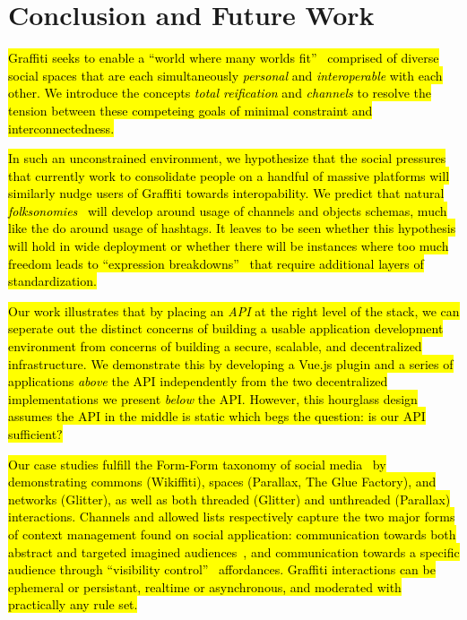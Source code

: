 \section{Conclusion and Future Work}

{\hl{%
Graffiti seeks to enable a ``world where many worlds fit''~{\cite{escobarpluriverse}}
comprised of diverse social spaces that are each simultaneously \emph{personal}
and \emph{interoperable} with each other.
We introduce the concepts \emph{total reification} and \emph{channels}
to resolve the tension between these competeing goals
of minimal constraint and interconnectedness.
}}%

{\hl{%
In such an unconstrained environment,
we hypothesize that the social pressures that currently work
to consolidate people on a handful of massive platforms
will similarly nudge users of Graffiti towards interopability.
We predict that natural \emph{folksonomies}~{\cite{folksonomy}} will
develop around usage of channels and objects schemas, much like the do around usage of hashtags.
It leaves to be seen whether this hypothesis will hold in wide deployment
or whether there will be instances where too much freedom leads to
``expression breakdowns''~{\cite{expressionbreakdowns}}
that require additional layers of standardization.
}}%

{\hl{%
Our work illustrates that by placing an \emph{API}
at the right level of the stack, we can seperate out the distinct concerns
of building a usable application development environment
from concerns of building a secure, scalable, and decentralized infrastructure.
We demonstrate this by developing a Vue.js plugin and a series
of applications \emph{above} the API independently from the
two decentralized implementations we present \emph{below} the API.
However, this hourglass design assumes the API in the middle is static
which begs the question: is our API sufficient?
}}%

{\hl{%
Our case studies fulfill the Form-Form taxonomy of social media~{\cite{formfrom}}
by demonstrating commons (Wikiffiti), spaces (Parallax, The Glue Factory), and networks (Glitter),
as well as both threaded (Glitter) and unthreaded (Parallax) interactions.
Channels and allowed lists respectively capture the two major
forms of context management found on social application:
communication towards both abstract and targeted imagined audiences~{\cite{imaginedaudience}},
and communication towards a specific audience through ``visibility control''~{\cite{visibilitycontrol}} affordances.
Graffiti interactions can be ephemeral or persistant, realtime or asynchronous,
and moderated with practically any rule set.
}}%

